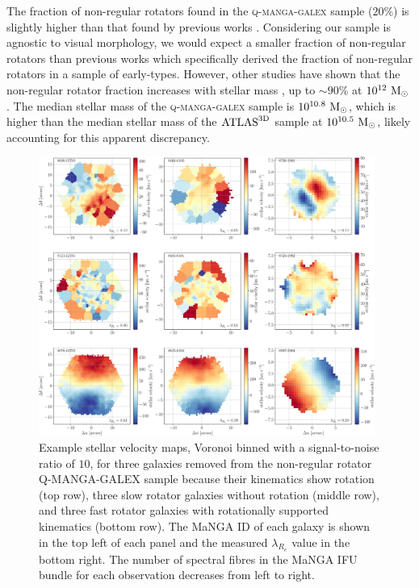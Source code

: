 \documentclass[useAMS,usenatbib]{mn2e}
\begin{document}
The fraction of non-regular rotators found in the \textsc{q-manga-galex} sample ($20\%$) is slightly higher than that found by previous works \citep[$14-17\%$ of early-types in the $\rm{ATLAS}^{\rm{3D}}$ sample; ][]{emsellem11, stott16}. Considering our sample is agnostic to visual morphology, we would expect a smaller fraction of non-regular rotators than previous works which specifically derived the fraction of non-regular rotators in a sample of early-types. However, other studies have shown that the non-regular rotator fraction increases with stellar mass \citep{cappellari13}, up to $\sim90\%$ at $10^{12}~\rm{M}_{\odot}$ \citep{veale17}. The median stellar mass of the \textsc{q-manga-galex} sample is $10^{10.8}~\rm{M}_{\odot}$, which is higher than the median stellar mass of the $\rm{ATLAS}^{\rm{3D}}$ sample at $10^{10.5}~\rm{M}_{\odot}$, likely accounting for this apparent discrepancy.

\begin{figure}
\centering
\includegraphics[width=0.98\textwidth]{../figures/proper_large_velmap_9_gal_aligned_ifu_bundles-MAPS-VOR10-GAU-MILESHC.pdf}
\caption{Example stellar velocity maps, Voronoi binned with a signal-to-noise ratio of $10$, for three galaxies removed from the non-regular rotator \textsc{Q-MANGA-GALEX} sample because their kinematics show rotation (top row), three slow rotator galaxies without rotation (middle row), and three fast rotator galaxies with rotationally supported kinematics (bottom row). The MaNGA ID of each galaxy is shown in the top left of each panel and the measured $\lambda_{R_{e}}$ value in the bottom right. The number of spectral fibres in the MaNGA IFU bundle for each observation decreases from left to right.}
\label{fig:exvelmaps}
\end{figure}  
\end{document}
